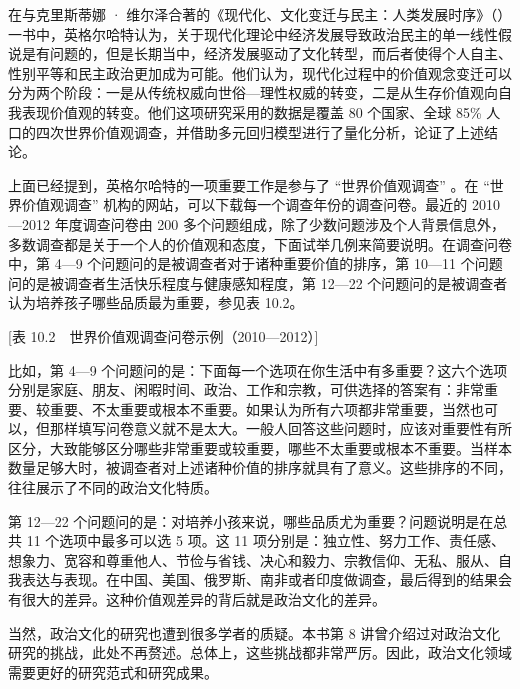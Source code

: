 在与克里斯蒂娜 · 维尔泽合著的《现代化、文化变迁与民主：人类发展时序》（）一书中，英格尔哈特认为，关于现代化理论中经济发展导致政治民主的单一线性假说是有问题的，但是长期当中，经济发展驱动了文化转型，而后者使得个人自主、性别平等和民主政治更加成为可能。他们认为，现代化过程中的价值观念变迁可以分为两个阶段：一是从传统权威向世俗—理性权威的转变，二是从生存价值观向自我表现价值观的转变。他们这项研究采用的数据是覆盖 80 个国家、全球 85\% 人口的四次世界价值观调查，并借助多元回归模型进行了量化分析，论证了上述结论。

上面已经提到，英格尔哈特的一项重要工作是参与了 “世界价值观调查” 。在 “世界价值观调查” 机构的网站，可以下载每一个调查年份的调查问卷。最近的 2010—2012 年度调查问卷由 200 多个问题组成，除了少数问题涉及个人背景信息外，多数调查都是关于一个人的价值观和态度，下面试举几例来简要说明。在调查问卷中，第 4—9 个问题问的是被调查者对于诸种重要价值的排序，第 10—11 个问题问的是被调查者生活快乐程度与健康感知程度，第 12—22 个问题问的是被调查者认为培养孩子哪些品质最为重要，参见表 10.2。

[表 10.2　世界价值观调查问卷示例（2010—2012）]


比如，第 4—9 个问题问的是：下面每一个选项在你生活中有多重要？这六个选项分别是家庭、朋友、闲暇时间、政治、工作和宗教，可供选择的答案有：非常重要、较重要、不太重要或根本不重要。如果认为所有六项都非常重要，当然也可以，但那样填写问卷意义就不是太大。一般人回答这些问题时，应该对重要性有所区分，大致能够区分哪些非常重要或较重要，哪些不太重要或根本不重要。当样本数量足够大时，被调查者对上述诸种价值的排序就具有了意义。这些排序的不同，往往展示了不同的政治文化特质。

第 12—22 个问题问的是：对培养小孩来说，哪些品质尤为重要？问题说明是在总共 11 个选项中最多可以选 5 项。这 11 项分别是：独立性、努力工作、责任感、想象力、宽容和尊重他人、节俭与省钱、决心和毅力、宗教信仰、无私、服从、自我表达与表现。在中国、美国、俄罗斯、南非或者印度做调查，最后得到的结果会有很大的差异。这种价值观差异的背后就是政治文化的差异。

当然，政治文化的研究也遭到很多学者的质疑。本书第 8 讲曾介绍过对政治文化研究的挑战，此处不再赘述。总体上，这些挑战都非常严厉。因此，政治文化领域需要更好的研究范式和研究成果。

